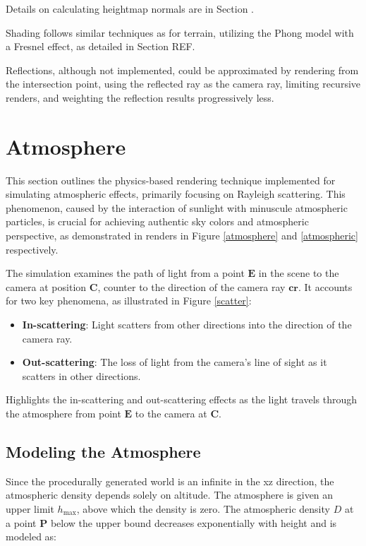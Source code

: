 Details on calculating heightmap normals are in Section .

Shading follows similar techniques as for terrain, utilizing the Phong model with a Fresnel effect, as detailed in Section REF. 

Reflections, although not implemented, could be approximated by rendering from the intersection point, using the reflected ray as the camera ray, limiting recursive renders, and weighting the reflection results progressively less. 

\section{Atmosphere}

This section outlines the physics-based rendering technique implemented for simulating atmospheric effects, primarily focusing on Rayleigh scattering. This phenomenon, caused by the interaction of sunlight with minuscule atmospheric particles, is crucial for achieving authentic sky colors and atmospheric perspective, as demonstrated in renders in Figure \ref{atmosphere}  and \ref{atmospheric} respectively.

The simulation examines the path of light from a point $\mathbf{E}$ in the scene to the camera at position $\mathbf{C}$, counter to the direction of the camera ray $\mathbf{cr}$. It accounts for two key phenomena, as illustrated in Figure \ref{scatter}:
\begin{itemize}
    \item \textbf{In-scattering}: Light scatters from other directions into the direction of the camera ray.
    \item \textbf{Out-scattering}: The loss of light from the camera's line of sight as it scatters in other directions.
\end{itemize}

{Highlights the in-scattering and out-scattering effects as the light travels through the atmosphere from point $\mathbf{E}$ to the camera at $\mathbf{C}$.}


\subsection{Modeling the Atmosphere}

Since the procedurally generated world is an infinite in the xz direction, the atmospheric density depends solely on altitude. The atmosphere is given an upper limit $h_{\text{max}}$, above which the density is zero. The atmospheric density $D$ at a point $\mathbf{P}$ below the upper bound decreases exponentially with height and is modeled as:

